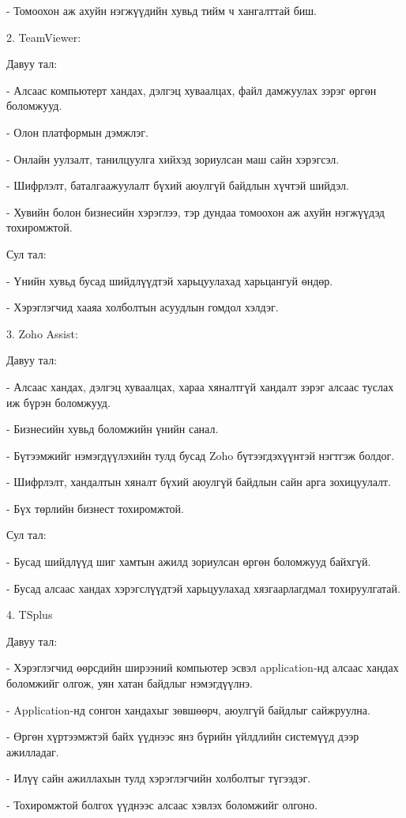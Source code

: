 	- Томоохон аж ахуйн нэгжүүдийн хувьд тийм ч хангалттай биш.

	2. TeamViewer:

	Давуу тал:
	
	- Алсаас компьютерт хандах, дэлгэц хуваалцах, файл дамжуулах зэрэг өргөн боломжууд.
	
	- Олон платформын дэмжлэг.
	
	- Онлайн уулзалт, танилцуулга хийхэд зориулсан маш сайн хэрэгсэл.
	
	- Шифрлэлт, баталгаажуулалт бүхий аюулгүй байдлын хүчтэй шийдэл.
	
	- Хувийн болон бизнесийн хэрэглээ, тэр дундаа томоохон аж ахуйн нэгжүүдэд тохиромжтой.
	
	Сул тал:

	- Үнийн хувьд бусад шийдлүүдтэй харьцуулахад харьцангуй өндөр.

	- Хэрэглэгчид хааяа холболтын асуудлын гомдол хэлдэг.

	3. Zoho Assist:

Давуу тал:

- Алсаас хандах, дэлгэц хуваалцах, хараа хяналтгүй хандалт зэрэг алсаас туслах иж бүрэн боломжууд.

- Бизнесийн хувьд боломжийн үнийн санал.

- Бүтээмжийг нэмэгдүүлэхийн тулд бусад Zoho бүтээгдэхүүнтэй нэгтгэж болдог.

- Шифрлэлт, хандалтын хяналт бүхий аюулгүй байдлын сайн арга зохицуулалт.

- Бүх төрлийн бизнест тохиромжтой.

Сул тал:

- Бусад шийдлүүд шиг хамтын ажилд зориулсан өргөн боломжууд байхгүй.

- Бусад алсаас хандах хэрэгслүүдтэй харьцуулахад хязгаарлагдмал тохируулгатай.

4. TSplus 

Давуу тал:

- Хэрэглэгчид өөрсдийн ширээний компьютер эсвэл application-нд алсаас хандах боломжийг олгож, уян хатан байдлыг нэмэгдүүлнэ.

- Application-нд сонгон хандахыг зөвшөөрч, аюулгүй байдлыг сайжруулна.

- Өргөн хүртээмжтэй байх үүднээс янз бүрийн үйлдлийн системүүд дээр ажилладаг.

-  Илүү сайн ажиллахын тулд хэрэглэгчийн холболтыг түгээдэг.

- Тохиромжтой болгох үүднээс алсаас хэвлэх боломжийг олгоно.


